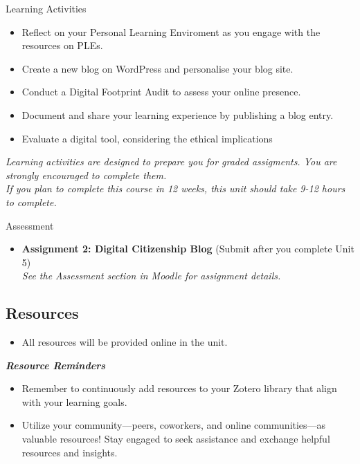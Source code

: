 \documentclass[
]{book}
\providecommand{\tightlist}{%
  \setlength{\itemsep}{0pt}\setlength{\parskip}{0pt}}
\theoremstyle{definition}
\theoremstyle{definition}
\theoremstyle{definition}
\theoremstyle{definition}
\theoremstyle{remark}
\begin{document}
\begin{reflect}
{Learning Activities}

\begin{itemize}
\tightlist
\item
  Reflect on your Personal Learning Enviroment as you engage with the resources on PLEs.\\
\item
  Create a new blog on WordPress and personalise your blog site.\\
\item
  Conduct a Digital Footprint Audit to assess your online presence.\\
\item
  Document and share your learning experience by publishing a blog entry.\\
\item
  Evaluate a digital tool, considering the ethical implications
\end{itemize}

\emph{Learning activities are designed to prepare you for graded assigments. You are strongly encouraged to complete them.\\
If you plan to complete this course in 12 weeks, this unit should take 9-12 hours to complete.}
\end{reflect}

\begin{assessment}
{Assessment}

\begin{itemize}
\tightlist
\item
  \textbf{Assignment 2: Digital Citizenship Blog} (Submit after you complete Unit 5)\\
  \emph{See the Assessment section in Moodle for assignment details.}
\end{itemize}
\end{assessment}

\hypertarget{resources-3}{%
\subsection*{Resources}\label{resources-3}}

\begin{itemize}
\tightlist
\item
  All resources will be provided online in the unit.
\end{itemize}

\begin{feedback}
\textbf{\emph{Resource Reminders}}

\begin{itemize}
\tightlist
\item
  Remember to continuously add resources to your Zotero library that
  align with your learning goals.
\item
  Utilize your community---peers, coworkers, and online communities---as
  valuable resources! Stay engaged to seek assistance and exchange
  helpful resources and insights.
\end{itemize}
\end{feedback}
\end{document}
